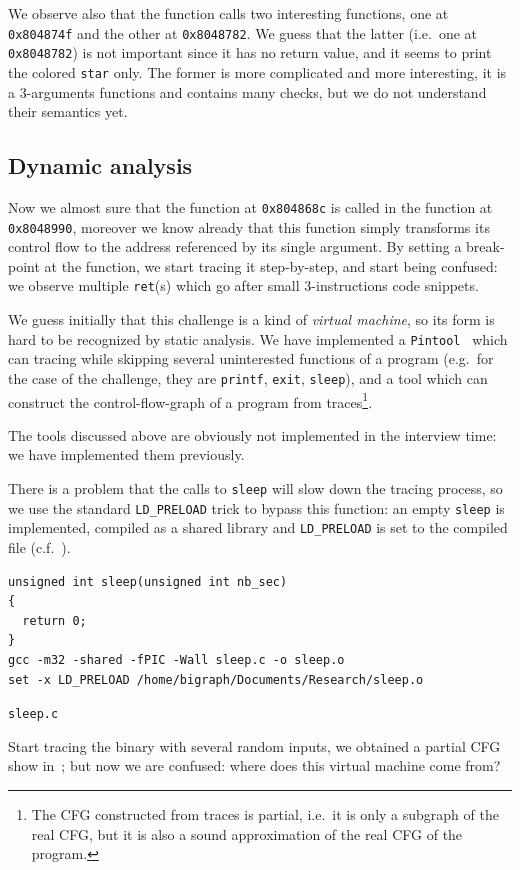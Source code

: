 \documentclass{easychair}
\begin{document}
We observe also that the function calls two interesting functions, one at \texttt{0x804874f} and the other at \texttt{0x8048782}. We guess that the latter (i.e.~one at \texttt{0x8048782}) is not important since it has no return value, and it seems to print the colored \texttt{star} only. The former is more complicated and more interesting, it is a $3$-arguments functions and contains many checks, but we do not understand their semantics yet.

\subsection{Dynamic analysis}
\label{sec:dynamic_analysis_quick}
Now we almost sure that the function at \texttt{0x804868c} is called in the function at \texttt{0x8048990}, moreover we know already that this function simply transforms its control flow to the address referenced by its single argument. By setting a break-point at the function, we start tracing it step-by-step, and start being confused: we observe multiple \texttt{ret}(s) which go after small $3$-instructions code snippets. 

We guess initially that this challenge is a kind of \emph{virtual machine}, so its form is hard to be recognized by static analysis. We have implemented a \texttt{Pintool}~\autocite{LukCMPKLWRH05} which can tracing while skipping several uninterested functions of a program (e.g.~for the case of the challenge, they are \texttt{printf}, \texttt{exit}, \texttt{sleep}), and a tool which can construct the control-flow-graph of a program from traces\footnote{The CFG constructed from traces is partial, i.e.~it is only a subgraph of the real CFG, but it is also a sound approximation of the real CFG of the program.}.

\begin{remark}
  The tools discussed above are obviously not implemented in the interview time: we have implemented them previously.
\end{remark}

There is a problem that the calls to \texttt{sleep} will slow down the tracing process, so we use the standard \texttt{LD\_PRELOAD} trick to bypass this function: an empty \texttt{sleep} is implemented, compiled as a shared library and \texttt{LD\_PRELOAD} is set to the compiled file (c.f.~).
\begin{listing}
  \begin{verbatim}
unsigned int sleep(unsigned int nb_sec)
{
  return 0;
}
gcc -m32 -shared -fPIC -Wall sleep.c -o sleep.o
set -x LD_PRELOAD /home/bigraph/Documents/Research/sleep.o
  \end{verbatim}
  \caption{\texttt{sleep.c}}
  \label{fig:sleep}
\end{listing}
Start tracing the binary with several random inputs, we obtained a partial CFG show in~; but now we are confused: where does this virtual machine come from? 
\end{document}
